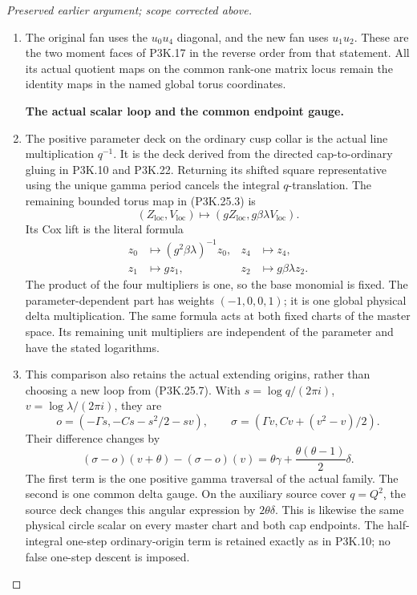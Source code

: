 \begin{proof}[Preserved earlier argument; scope corrected above]
\begin{enumerate}[label=\arabic*.]
\item The original fan uses the \(u_0u_4\) diagonal, and the new fan
uses \(u_1u_2\). These are the two moment faces of P3K.17 in
the reverse order from that statement. All its actual quotient
maps on the common rank-one matrix locus remain the identity
maps in the named global torus coordinates.

\par\medskip\noindent\textbf{The actual scalar loop and the common endpoint gauge.}\enspace

\item The positive parameter deck on the ordinary cusp collar is
the actual line multiplication \(q^{-1}\). It is the deck
derived from the directed cap-to-ordinary gluing in P3K.10
and P3K.22. Returning its shifted square representative using
the unique gamma period cancels the integral \(q\)-translation.
The remaining bounded torus map in (P3K.25.3) is
\[
       (Z_{\mathrm{loc}},V_{\mathrm{loc}})
           \longmapsto(gZ_{\mathrm{loc}},
                             g\beta\lambda V_{\mathrm{loc}}).
                                                        \tag{P3K.25.6}
\]
Its Cox lift is the literal formula
\[
\begin{aligned}
 z_0&\longmapsto(g^2\beta\lambda)^{-1}z_0,
 & z_4&\longmapsto z_4,\\
 z_1&\longmapsto gz_1,
 & z_2&\longmapsto g\beta\lambda z_2 .
\end{aligned}                                          \tag{P3K.25.7}
\]
The product of the four multipliers is one, so the base
monomial is fixed. The parameter-dependent part has weights
\((-1,0,0,1)\); it is one global physical delta multiplication.
The same formula acts at both fixed charts of the master
space. Its remaining unit multipliers are independent of the
parameter and have the stated logarithms.

\item This comparison also retains the actual extending origins,
rather than choosing a new loop from (P3K.25.7).
With \(s=\log q/(2\pi i)\), \(v=\log\lambda/(2\pi i)\),
they are
\[
 o=(-\Gamma s,-Cs-s^2/2-sv),\qquad
 \sigma=(\Gamma v,Cv+(v^2-v)/2).
\]
Their difference changes by
\[
 (\sigma-o)(v+\theta)-(\sigma-o)(v)
     =\theta\gamma+\frac{\theta(\theta-1)}2\delta.
                                                        \tag{P3K.25.8}
\]
The first term is the one positive gamma traversal of the
actual family. The second is one common delta gauge. On the
auxiliary source cover \(q=Q^2\), the source deck changes this
angular expression by \(2\theta\delta\). This is likewise the
same physical circle scalar on every master chart and both
cap endpoints. The half-integral one-step ordinary-origin
term is retained exactly as in P3K.10; no false one-step
descent is imposed.


\end{enumerate}
\end{proof}
